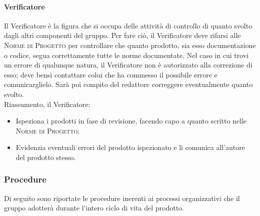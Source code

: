 \documentclass[../norme-di-progetto.tex]{subfiles}
\begin{document}
\paragraph{Verificatore}
Il Verificatore è la figura che si occupa delle attività di controllo di quanto svolto dagli altri componenti del gruppo. Per fare ciò, il Verificatore deve rifarsi alle \textsc{Norme di Progetto} per controllare che quanto prodotto, sia esso documentazione o codice, segua correttamente tutte le norme documentate. Nel caso in cui trovi un errore di qualunque natura, il Verificatore non è autorizzato alla correzione di esso; deve bensì contattare colui che ha commesso il possibile errore e comunicarglielo. Sarà poi compito del redattore correggere eventualmente quanto svolto. \\
Riassumento, il Verificatore:
\begin{itemize}
  \item Ispeziona i prodotti in fase di revisione, facendo capo a quanto scritto nelle \textsc{Norme di Progetto};
  \item Evidenzia eventuali errori del prodotto ispezionato e li comunica all'autore del prodotto stesso.
\end{itemize}

\subsubsection{Procedure}
Di seguito sono riportate le procedure inerenti ai processi organizzativi che il gruppo adotterà durante l'intero ciclo di vita del prodotto.
\end{document}
